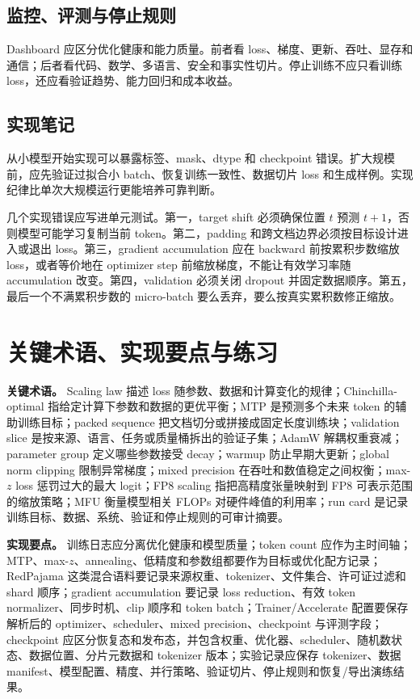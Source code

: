 \documentclass[UTF8,zihao=-4,openany]{ctexbook}
\begin{document}
\subsection{监控、评测与停止规则}
Dashboard 应区分优化健康和能力质量。前者看 loss、梯度、更新、吞吐、显存和通信；后者看代码、数学、多语言、安全和事实性切片。停止训练不应只看训练 loss，还应看验证趋势、能力回归和成本收益。

\subsection{实现笔记}
从小模型开始实现可以暴露标签、mask、dtype 和 checkpoint 错误。扩大规模前，应先验证过拟合小 batch、恢复训练一致性、数据切片 loss 和生成样例。实现纪律比单次大规模运行更能培养可靠判断。

几个实现错误应写进单元测试。第一，target shift 必须确保位置 $t$ 预测 $t+1$，否则模型可能学习复制当前 token。第二，padding 和跨文档边界必须按目标设计进入或退出 loss。第三，gradient accumulation 应在 backward 前按累积步数缩放 loss，或者等价地在 optimizer step 前缩放梯度，不能让有效学习率随 accumulation 改变。第四，validation 必须关闭 dropout 并固定数据顺序。第五，最后一个不满累积步数的 micro-batch 要么丢弃，要么按真实累积数修正缩放。

\section{关键术语、实现要点与练习}
\textbf{关键术语。} Scaling law 描述 loss 随参数、数据和计算变化的规律；Chinchilla-optimal 指给定计算下参数和数据的更优平衡；MTP 是预测多个未来 token 的辅助训练目标；packed sequence 把文档切分或拼接成固定长度训练块；validation slice 是按来源、语言、任务或质量桶拆出的验证子集；AdamW 解耦权重衰减；parameter group 定义哪些参数接受 decay；warmup 防止早期大更新；global norm clipping 限制异常梯度；mixed precision 在吞吐和数值稳定之间权衡；max-$z$ loss 惩罚过大的最大 logit；FP8 scaling 指把高精度张量映射到 FP8 可表示范围的缩放策略；MFU 衡量模型相关 FLOPs 对硬件峰值的利用率；run card 是记录训练目标、数据、系统、验证和停止规则的可审计摘要。

\textbf{实现要点。} 训练日志应分离优化健康和模型质量；token count 应作为主时间轴；MTP、max-$z$、annealing、低精度和参数组都要作为目标或优化配方记录；RedPajama 这类混合语料要记录来源权重、tokenizer、文件集合、许可证过滤和 shard 顺序；gradient accumulation 要记录 loss reduction、有效 token normalizer、同步时机、clip 顺序和 token batch；Trainer/Accelerate 配置要保存解析后的 optimizer、scheduler、mixed precision、checkpoint 与评测字段；checkpoint 应区分恢复态和发布态，并包含权重、优化器、scheduler、随机数状态、数据位置、分片元数据和 tokenizer 版本；实验记录应保存 tokenizer、数据 manifest、模型配置、精度、并行策略、验证切片、停止规则和恢复/导出演练结果。
\end{document}
